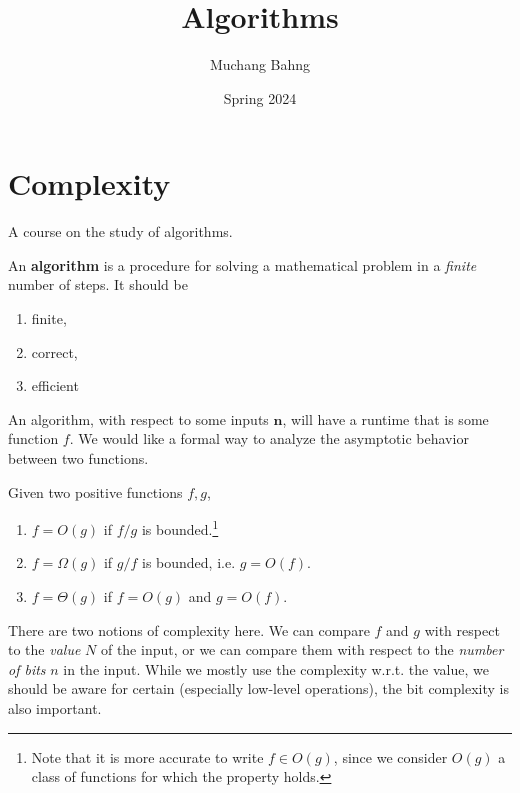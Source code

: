 \documentclass{article}
\begin{document}
\title{Algorithms}
\author{Muchang Bahng}
\date{Spring 2024}

\maketitle
\tableofcontents
\pagebreak

\section{Complexity}

    A course on the study of algorithms. 

    \begin{definition}[Algorithm]
      An \textbf{algorithm} is a procedure for solving a mathematical problem in a \textit{finite} number of steps. It should be 
      \begin{enumerate}
        \item finite, 
        \item correct,
        \item efficient
      \end{enumerate}
    \end{definition}

    An algorithm, with respect to some inputs $\mathbf{n}$, will have a runtime that is some function $f$. We would like a formal way to analyze the asymptotic behavior between two functions. 

    \begin{definition}[Complexity]
      Given two positive functions $f, g$, 
      \begin{enumerate}
        \item $f = O(g)$ if $f/g$ is bounded.\footnote{Note that it is more accurate to write $f \in O(g)$, since we consider $O(g)$ a class of functions for which the property holds.} 
        \item $f = \Omega(g)$ if $g/f$ is bounded, i.e. $g = O(f)$. 
        \item $f = \Theta (g)$ if $f = O(g)$ and $g = O(f)$. 
      \end{enumerate}
    \end{definition}

    There are two notions of complexity here. We can compare $f$ and $g$ with respect to the \textit{value} $N$ of the input, or we can compare them with respect to the \textit{number of bits} $n$ in the input. While we mostly use the complexity w.r.t. the value, we should be aware for certain (especially low-level operations), the bit complexity is also important. 
\end{document}
